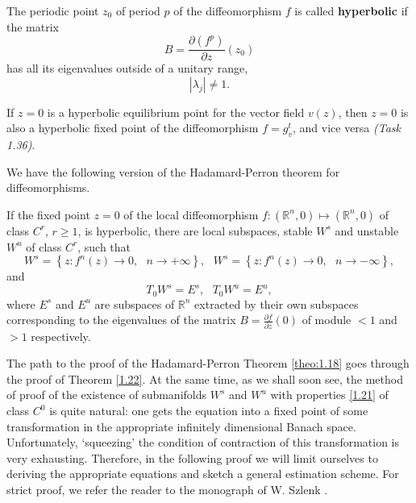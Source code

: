 \begin{definition}
	The periodic point $z_0$ of period $p$ of the diffeomorphism $f$ is called \textbf{hyperbolic} if the matrix
	$$
	B=\frac{\partial (f^{p})}{\partial z}(z_{0})
	$$
	has all its eigenvalues outside of a unitary range,
	$$
	\left\vert \lambda _{j}\right\vert \not=1.
	$$
\end{definition}

\begin{lemma}\label{lemma:1.21}
	If $z = 0$ is a hyperbolic equilibrium point for the vector field $v (z)$, then $z = 0$ is also a hyperbolic fixed point of the diffeomorphism $f = g^t_v$, and vice versa \emph{(Task 1.36)}.
\end{lemma}

We have the following version of the Hadamard-Perron theorem for diffeomorphisms.

\begin{theorem}\label{theo:1.22}
	If the fixed point $z=0$ of the local diffeomorphism $f:\left( \mathbb{R}^{n},0\right) \longmapsto
	\left( \mathbb{R}^{n},0\right) $ of class $C^r$, $r \geq 1$, is hyperbolic, there are local subspaces, stable $W^s$ and unstable $W^u$ of class $C^r$, such that
	\begin{equation}
	\label{1.21}
	W^{s}=\left\{ z:f^{n}(z)\rightarrow 0,\text{ }n\rightarrow +\infty \right\} ,%
	\text{ \ }W^{s}=\left\{ z:f^{n}(z)\rightarrow 0,\text{ }n\rightarrow -\infty
	\right\} ,
	\end{equation}
	and
	\begin{equation}
	\label{1.22}
	T_{0}W^{s}=E^{s},\text{ \ \ }T_{0}W^{u}=E^{u},
	\end{equation}
	where $E^s$ and $E^u$ are subspaces of $\mathbb{R}^n$ extracted by their own subspaces corresponding to the eigenvalues of the matrix $B=\frac{\partial f}{\partial z}(0)$ of module $< 1$ and $> 1$ respectively.
\end{theorem}

The path to the proof of the Hadamard-Perron Theorem \ref{theo:1.18} goes through the proof of Theorem \ref{1.22}. 
At the same time, as we shall soon see, the method of proof of the existence of submanifolds $W^s$ and $W^u$ with properties \eqref{1.21} of class $C^0$ is quite natural:
one gets the equation into a fixed point of some transformation in the appropriate infinitely dimensional Banach space.
Unfortunately, `squeezing' the condition of contraction of this transformation is very exhausting.
Therefore, in the following proof we will limit ourselves to deriving the appropriate equations and sketch a general estimation scheme.
For strict proof, we refer the reader to the monograph of W. Szlenk \cite{Szl}.

